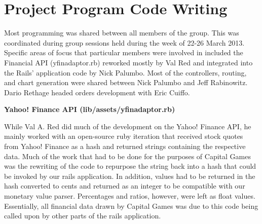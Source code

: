\chapter{Project Program Code Writing}

Most programming was shared between all members of the group. This was coordinated during group sessions held during the week of 22-26 March 2013. Specific areas of focus that particular members were involved in included the Financial API (yfinadaptor.rb) reworked mostly by Val Red and integrated into the Rails' application code by Nick Palumbo. Most of the controllers, routing, and chart generation were shared between Nick Palumbo and Jeff Rabinowitz. Dario Rethage headed orders development with Eric Cuiffo.

{\bfseries Yahoo! Finance API (lib/assets/yfinadaptor.rb)} 

While Val A. Red did much of the development on the Yahoo! Finance API, he mainly worked with an open-source ruby iteration that received stock quotes from Yahoo! Finance as a hash and returned strings containing the respective data. Much of the work that had to be done for the purposes of Capital Games was the rewriting of the code to repurpose the string back into a hash that could be invoked by our rails application. In addition, values had to be returned in the hash converted to cents and returned as an integer to be compatible with our monetary value parser. Percentages and ratios, however, were left as float values. Essentially, all financial data drawn by Capital Games was due to this code being called upon by other parts of the rails application.
